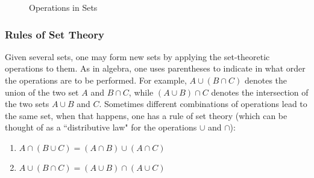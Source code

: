 \begin{figure}[htp]
    \centering
    \begin{subfigure}[b]{0.25\textwidth}
    \centering
    \end{subfigure}
    \begin{subfigure}[b]{0.25\textwidth}
    \centering
    \end{subfigure}
    \begin{subfigure}[b]{0.25\textwidth}
    \centering
    \end{subfigure}
    \caption{Operations in Sets}
    \label{fig:set_operations}
\end{figure}

\subsubsection{Rules of Set Theory}\label{sec:rules_of_set_theory}

Given several sets, one may form new sets by applying the set-theoretic operations to them. As in algebra, one uses parentheses to indicate in what order the operations are to be performed. For example, $A \cup (B \cap C)$ denotes the union of the two set $A$ and $B \cap C$, while $(A \cup B) \cap C$ denotes the intersection of the two sets $A \cup B$ and $C$. Sometimes different combinations of operations lead to the same set, when that happens, one has a rule of set theory (which can be thought of as a ``distributive law" for the operations $\cup$ and $\cap$):
\newpage
\begin{enumerate}[itemsep=0pt,topsep=0pt]
    \item $A \cap (B \cup C) = (A \cap B) \cup (A \cap C)$
    \item $A \cup (B \cap C) = (A \cup B) \cap (A \cup C)$
\end{enumerate}

